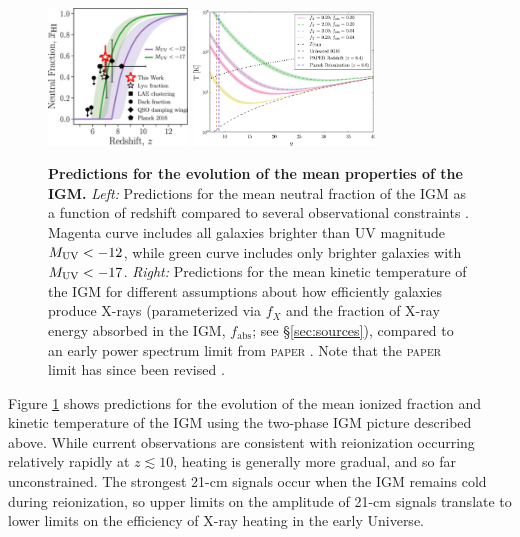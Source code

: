 \begin{figure}[]
\begin{center}
\vspace{50pt} \includegraphics[width=0.33\textwidth]{Mirocha/mason2018_fig12.pdf} \hspace{20pt} 
\includegraphics[width=0.43\textwidth]{Mirocha/pober2015_fig7.pdf}
\end{center}
\caption{{\bf Predictions for the evolution of the mean properties of the IGM.} \textit{Left:} Predictions for the mean neutral fraction of the IGM as a function of redshift compared to several observational constraints \cite{Mason2018}. Magenta curve includes all galaxies brighter than UV magnitude $M_{\text{UV}} < -12$, while green curve includes only brighter galaxies with $M_{\text{UV}} < -17$. \textit{Right:} Predictions for the mean kinetic temperature of the IGM \cite{Pober2015} for different assumptions about how efficiently galaxies produce X-rays (parameterized via $f_X$ and the fraction of X-ray energy absorbed in the IGM, $f_{\mathrm{abs}}$; see \S\ref{sec:sources}), compared to an early power spectrum limit from \textsc{paper} \cite{Parsons2014,Ali2015}. Note that the \textsc{paper} limit has since been revised \cite{Cheng2018,Kolopanis2019}.}
\label{fig:mean_igm}
\end{figure}

Figure \ref{fig:mean_igm} shows predictions for the evolution of the mean ionized fraction and kinetic temperature of the IGM \cite{Mason2018,Pober2015} using the two-phase IGM picture described above. While current observations are consistent with reionization occurring relatively rapidly at $z \lesssim 10$, heating is generally more gradual, and so far unconstrained. The strongest 21-cm signals occur when the IGM remains cold during reionization, so upper limits on the amplitude of 21-cm signals translate to lower limits on the efficiency of X-ray heating in the early Universe.


